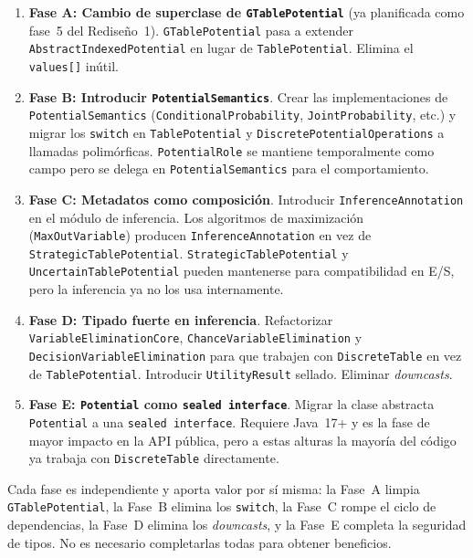 \documentclass[11pt,a4paper]{article}
\newcommand{\code}[1]{\texttt{#1}}
\begin{document}
\begin{enumerate}
  \item \textbf{Fase A: Cambio de superclase de \code{GTablePotential}}
        (ya planificada como fase~5 del Rediseño~1).  \code{GTablePotential}
        pasa a extender \code{AbstractIndexedPotential} en lugar de
        \code{TablePotential}.  Elimina el \code{values[]} inútil.

  \item \textbf{Fase B: Introducir \code{PotentialSemantics}}.
        Crear las implementaciones de \code{PotentialSemantics}
        (\code{ConditionalProbability}, \code{JointProbability}, etc.) y
        migrar los \code{switch} en \code{TablePotential} y
        \code{DiscretePotentialOperations} a llamadas polimórficas.
        \code{PotentialRole} se mantiene temporalmente como campo pero
        se delega en \code{PotentialSemantics} para el comportamiento.

  \item \textbf{Fase C: Metadatos como composición}.
        Introducir \code{InferenceAnnotation} en el módulo de inferencia.
        Los algoritmos de maximización (\code{MaxOutVariable}) producen
        \code{InferenceAnnotation} en vez de \code{StrategicTablePotential}.
        \code{StrategicTablePotential} y \code{UncertainTablePotential}
        pueden mantenerse para compatibilidad en E/S, pero la inferencia
        ya no los usa internamente.

  \item \textbf{Fase D: Tipado fuerte en inferencia}.
        Refactorizar \code{VariableEliminationCore},
        \code{ChanceVariableElimination} y \code{DecisionVariableElimination}
        para que trabajen con \code{DiscreteTable} en vez de
        \code{TablePotential}.  Introducir \code{UtilityResult} sellado.
        Eliminar \emph{downcasts}.

  \item \textbf{Fase E: \code{Potential} como \code{sealed interface}}.
        Migrar la clase abstracta \code{Potential} a una \code{sealed
        interface}.  Requiere Java~17+ y es la fase de mayor impacto en
        la API pública, pero a estas alturas la mayoría del código ya
        trabaja con \code{DiscreteTable} directamente.
\end{enumerate}

Cada fase es independiente y aporta valor por sí misma: la Fase~A limpia
\code{GTablePotential}, la Fase~B elimina los \code{switch}, la Fase~C
rompe el ciclo de dependencias, la Fase~D elimina los \emph{downcasts},
y la Fase~E completa la seguridad de tipos.  No es necesario completarlas
todas para obtener beneficios.
\end{document}

